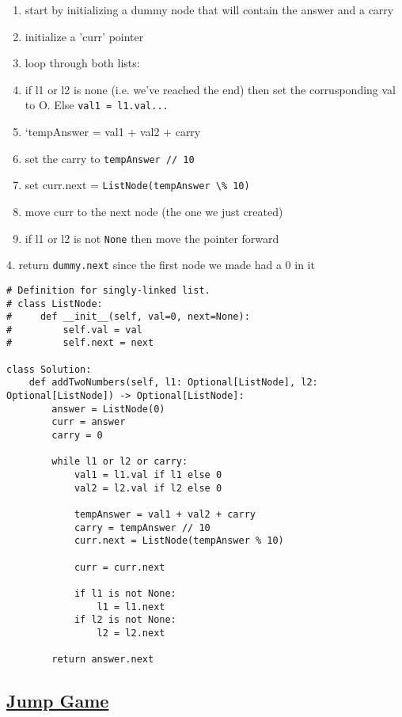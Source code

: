 \documentclass{article}
\begin{document}
\begin{enumerate}
\item start by initializing a dummy node that will contain the answer and a carry
\item initialize a 'curr' pointer
\item loop through both lists:
\item if l1 or l2 is none (i.e. we've reached the end) then set the corrusponding val to O. Else \lstinline{val1 = l1.val...}
\item `tempAnswer = val1 + val2 + carry
\item set the carry to \lstinline{tempAnswer // 10}
\item set curr.next = \lstinline{ListNode(tempAnswer \% 10)}
\item move curr to the next node (the one we just created)
\item if l1 or l2 is not \lstinline{None} then move the pointer forward
\end{enumerate}
4. return \lstinline{dummy.next} since the first node we made had a 0 in it

\begin{lstlisting}
# Definition for singly-linked list.
# class ListNode:
#     def __init__(self, val=0, next=None):
#         self.val = val
#         self.next = next

class Solution:
    def addTwoNumbers(self, l1: Optional[ListNode], l2: Optional[ListNode]) -> Optional[ListNode]:
        answer = ListNode(0)
        curr = answer
        carry = 0

        while l1 or l2 or carry:
            val1 = l1.val if l1 else 0
            val2 = l2.val if l2 else 0
                
            tempAnswer = val1 + val2 + carry
            carry = tempAnswer // 10
            curr.next = ListNode(tempAnswer % 10)

            curr = curr.next

            if l1 is not None:
                l1 = l1.next
            if l2 is not None:
                l2 = l2.next
        
        return answer.next
\end{lstlisting}

\subsection{\href{https://leetcode.com/problems/jump-game/description/?envType=company&envId=amazon&favoriteSlug=amazon-thirty-days}{Jump Game}}
\end{document}
